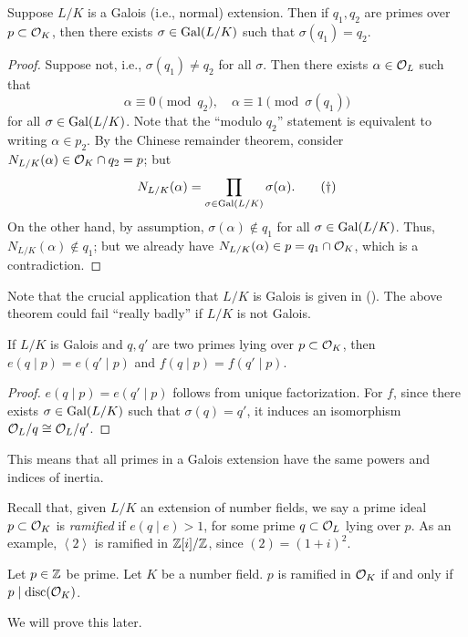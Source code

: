 \begin{theorem} \label{thm:galois_permutation_of_prime_ideals}
    Suppose $L/K$ is a Galois (i.e., normal) extension. Then if $q_1, q_2$ are primes over $p \subset \mathcal O_K$, then there exists $\sigma \in \operatorname{Gal}(L/K)$ such that $\sigma(q_1) = q_2$.
\end{theorem}
\begin{proof}
    Suppose not, i.e., $\sigma(q_1) \neq q_2$ for all $\sigma$. Then there exists $\alpha \in \mathcal O_L$ such that
    \[ \alpha \equiv 0 \pmod{q_2}, \quad \alpha \equiv 1 \pmod{\sigma(q_1)} \]
    for all $\sigma \in \operatorname{Gal}(L/K)$. Note that the ``modulo $q_2$'' statement is equivalent to writing $\alpha \in p_2$. By the Chinese remainder theorem, consider $N_{L/K}(\alpha) \in \mathcal O_K \cap q_2 = p$; but
    \[ N_{L/K}(\alpha) = \prod_{\sigma \in \operatorname{Gal}(L/K)} \sigma(\alpha). \tag{\textdagger} \]
    On the other hand, by assumption, $\sigma(\alpha) \notin q_1$ for all $\sigma \in \operatorname{Gal}(L/K)$. Thus, $N_{L/K}(\alpha) \notin q_1$; but we already have $N_{L/K}(\alpha) \in p = q_1 \cap \mathcal O_K$, which is a contradiction.
\end{proof}

Note that the crucial application that $L/K$ is Galois is given in (\textdagger). The above theorem could fail ``really badly'' if $L/K$ is not Galois.

\begin{corollary} \label{cor:primes_lying_over_galois}
    If $L/K$ is Galois and $q, q'$ are two primes lying over $p \subset \mathcal O_K$, then $e(q \mid p) = e(q' \mid p)$ and $f(q \mid p) = f(q' \mid p)$.
\end{corollary}
\begin{proof}
    $e(q \mid p) = e(q' \mid p)$ follows from unique factorization. For $f$, since there exists $\sigma \in \operatorname{Gal}(L/K)$ such that $\sigma(q) = q'$, it induces an isomorphism $\mathcal O_L/q \cong \mathcal O_L/q'$.
\end{proof}

\newpage
This means that all primes in a Galois extension have the same powers and indices of inertia.

Recall that, given $L/K$ an extension of number fields, we say a prime ideal $p \subset \mathcal O_K$ is \textit{ramified} if $e(q \mid e) > 1$, for some prime $q \subset \mathcal O_L$ lying over $p$. As an example, $\left<2\right>$ is ramified in $\mathbb Z[i]/\mathbb Z$, since $(2) = (1 + i)^2$.

\begin{theorem*}
    Let $p \in \mathbb Z$ be prime. Let $K$ be a number field. $p$ is ramified in $\mathcal O_K$ if and only if $p \mid \operatorname{disc}(\mathcal O_K)$.
\end{theorem*}

We will prove this later.